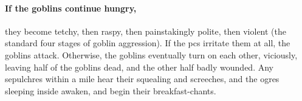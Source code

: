 \paragraph{If the goblins continue hungry,}
they become tetchy, then raspy, then painstakingly polite, then violent (the standard four stages of goblin aggression).
If the \glspl{pc} irritate them at all, the goblins attack.
Otherwise, the goblins eventually turn on each other, viciously, leaving half of the goblins dead, and the other half badly wounded.
Any \glspl{sepulchre} within a mile hear their squealing and screeches, and the \glspl{ogre} sleeping inside awaken, and begin their breakfast-chants.
